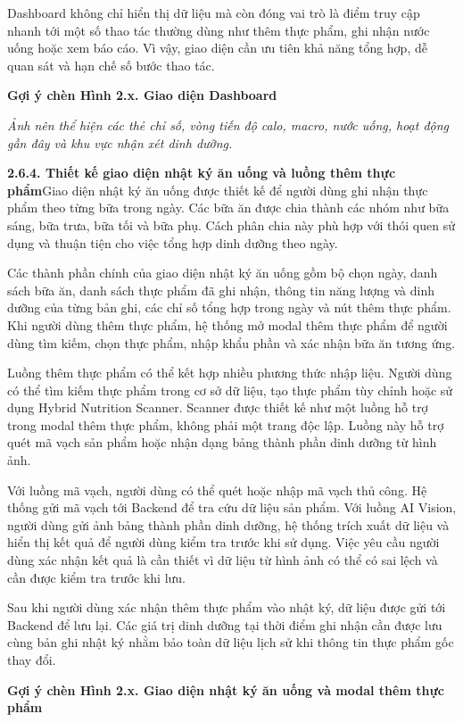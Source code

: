 Dashboard không chỉ hiển thị dữ liệu mà còn đóng vai trò là điểm truy cập nhanh tới một số thao tác thường dùng như thêm thực phẩm, ghi nhận nước uống hoặc xem báo cáo. Vì vậy, giao diện cần ưu tiên khả năng tổng hợp, dễ quan sát và hạn chế số bước thao tác.

\textbf{Gợi ý chèn Hình 2.x. Giao diện Dashboard}

\textit{Ảnh nên thể hiện các thẻ chỉ số, vòng tiến độ calo, macro, nước uống, hoạt động gần đây và khu vực nhận xét dinh dưỡng.}

\textbf{2.6.4. Thiết kế giao diện nhật ký ăn uống và luồng thêm thực phẩm}Giao diện nhật ký ăn uống được thiết kế để người dùng ghi nhận thực phẩm theo từng bữa trong ngày. Các bữa ăn được chia thành các nhóm như bữa sáng, bữa trưa, bữa tối và bữa phụ. Cách phân chia này phù hợp với thói quen sử dụng và thuận tiện cho việc tổng hợp dinh dưỡng theo ngày.

Các thành phần chính của giao diện nhật ký ăn uống gồm bộ chọn ngày, danh sách bữa ăn, danh sách thực phẩm đã ghi nhận, thông tin năng lượng và dinh dưỡng của từng bản ghi, các chỉ số tổng hợp trong ngày và nút thêm thực phẩm. Khi người dùng thêm thực phẩm, hệ thống mở modal thêm thực phẩm để người dùng tìm kiếm, chọn thực phẩm, nhập khẩu phần và xác nhận bữa ăn tương ứng.

Luồng thêm thực phẩm có thể kết hợp nhiều phương thức nhập liệu. Người dùng có thể tìm kiếm thực phẩm trong cơ sở dữ liệu, tạo thực phẩm tùy chỉnh hoặc sử dụng Hybrid Nutrition Scanner. Scanner được thiết kế như một luồng hỗ trợ trong modal thêm thực phẩm, không phải một trang độc lập. Luồng này hỗ trợ quét mã vạch sản phẩm hoặc nhận dạng bảng thành phần dinh dưỡng từ hình ảnh.

Với luồng mã vạch, người dùng có thể quét hoặc nhập mã vạch thủ công. Hệ thống gửi mã vạch tới Backend để tra cứu dữ liệu sản phẩm. Với luồng AI Vision, người dùng gửi ảnh bảng thành phần dinh dưỡng, hệ thống trích xuất dữ liệu và hiển thị kết quả để người dùng kiểm tra trước khi sử dụng. Việc yêu cầu người dùng xác nhận kết quả là cần thiết vì dữ liệu từ hình ảnh có thể có sai lệch và cần được kiểm tra trước khi lưu.

Sau khi người dùng xác nhận thêm thực phẩm vào nhật ký, dữ liệu được gửi tới Backend để lưu lại. Các giá trị dinh dưỡng tại thời điểm ghi nhận cần được lưu cùng bản ghi nhật ký nhằm bảo toàn dữ liệu lịch sử khi thông tin thực phẩm gốc thay đổi.

\textbf{Gợi ý chèn Hình 2.x. Giao diện nhật ký ăn uống và modal thêm thực phẩm}

